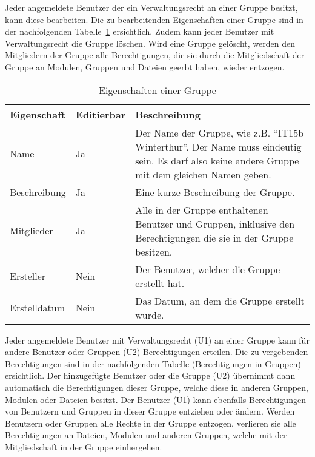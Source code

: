 Jeder angemeldete Benutzer der ein Verwaltungsrecht an einer Gruppe besitzt, kann diese bearbeiten. Die zu bearbeitenden Eigenschaften einer Gruppe sind in der nachfolgenden Tabelle~\ref{tab:gruppe_eigenschaften} ersichtlich. Zudem kann jeder Benutzer mit Verwaltungsrecht die Gruppe löschen. Wird eine Gruppe gelöscht, werden den Mitgliedern der Gruppe alle Berechtigungen, die sie durch die Mitgliedschaft der Gruppe an Modulen, Gruppen und Dateien geerbt haben, wieder entzogen.

\begin{table}[H]
\begin{tabularx}{\textwidth}{|l|l|X|} \hline
\textbf{Eigenschaft} &\textbf{Editierbar} & \textbf{Beschreibung} \\ \hline
Name				& Ja 	& Der Name der Gruppe, wie z.B. “IT15b Winterthur”. Der Name muss eindeutig sein. Es darf also keine andere Gruppe mit dem gleichen Namen geben.\\ \hline
Beschreibung		& Ja 	& Eine kurze Beschreibung der Gruppe.\\ \hline
Mitglieder			& Ja 	& Alle in der Gruppe enthaltenen Benutzer und Gruppen, inklusive den Berechtigungen die sie in der Gruppe besitzen.\\ \hline
Ersteller	 		& Nein 	& Der Benutzer, welcher die Gruppe erstellt hat.\\ \hline
Erstelldatum		& Nein 	& Das Datum, an dem die Gruppe erstellt wurde.\\ \hline
\end{tabularx}
\caption{Eigenschaften einer Gruppe}
\label{tab:gruppe_eigenschaften}
\end{table}

Jeder angemeldete Benutzer mit Verwaltungsrecht (U1) an einer Gruppe kann für andere Benutzer oder Gruppen (U2) Berechtigungen erteilen. Die zu vergebenden Berechtigungen sind in der nachfolgenden Tabelle (Berechtigungen in Gruppen) ersichtlich. Der hinzugefügte Benutzer oder die Gruppe (U2) übernimmt dann automatisch die Berechtigungen dieser Gruppe, welche diese in anderen Gruppen, Modulen oder Dateien besitzt.
Der Benutzer (U1) kann ebenfalls Berechtigungen von Benutzern und Gruppen in dieser Gruppe entziehen oder ändern. Werden Benutzern oder Gruppen alle Rechte in der Gruppe entzogen, verlieren sie alle Berechtigungen an Dateien, Modulen und anderen Gruppen, welche mit der Mitgliedschaft in der Gruppe einhergehen.


